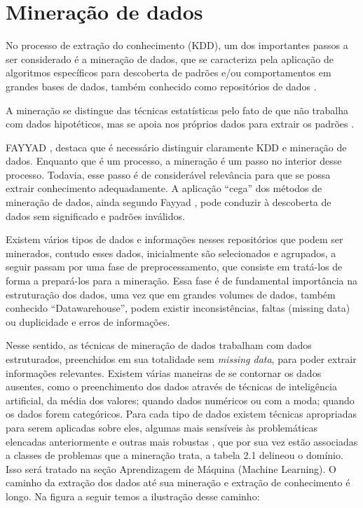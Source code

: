 
\pagebreak

\section{Mineração de dados}

No processo de extração do conhecimento (KDD), um dos importantes passos a ser considerado é a mineração de dados, que se caracteriza pela aplicação de algoritmos 
específicos para descoberta de padrões e/ou comportamentos em grandes bases de dados, também conhecido como repositórios de dados \cite{FayyadUeoutros}.

A mineração se distingue das técnicas estatísticas pelo fato de que  não trabalha com dados hipotéticos, mas se apoia nos próprios dados para extrair os padrões \cite{Castanheira2008}. 

FAYYAD \cite{FayyadUeoutros}, destaca que é necessário distinguir claramente KDD e mineração de dados. Enquanto que é um processo, a mineração é um passo no interior desse processo. 
Todavia, esse passo é de considerável relevância para que se possa extrair conhecimento adequadamente. 
A aplicação “cega” dos métodos de mineração de dados, ainda segundo Fayyad \cite{FayyadUeoutros}, pode conduzir à descoberta de dados sem significado e padrões inválidos. 

Existem vários tipos de dados e informações nesses repositórios que podem ser minerados, contudo esses dados, inicialmente são selecionados e agrupados, a seguir passam por 
uma fase de preprocessamento, que consiste em tratá-los de forma a prepará-los para a mineração. Essa fase é de 
fundamental importância na estruturação dos dados, uma vez que em grandes volumes de dados, também conhecido ``Datawarehouse'', podem existir inconsistências, faltas (missing data) ou 
duplicidade e erros de informações.

Nesse sentido, as técnicas de mineração de dados trabalham com dados estruturados, preenchidos em sua totalidade sem \textit{missing data}, para poder extrair informações relevantes.
Existem várias maneiras de se contornar os dados ausentes, como o preenchimento dos dados através de técnicas de inteligência artificial, da média dos valores; quando dados numéricos 
ou com a moda; quando os dados forem categóricos. Para cada tipo de dados existem técnicas apropriadas para serem aplicadas sobre eles, algumas mais sensíveis às problemáticas elencadas anteriormente
e outras mais robustas \cite{DataMining2}, que por sua vez estão associadas a classes de problemas que a mineração trata, a tabela 2.1 delineou o domínio.
Isso será tratado na seção Aprendizagem de Máquina (Machine Learning).
O caminho da extração dos dados até sua mineração e extração de conhecimento é longo.
Na figura a seguir temos a ilustração desse caminho:

